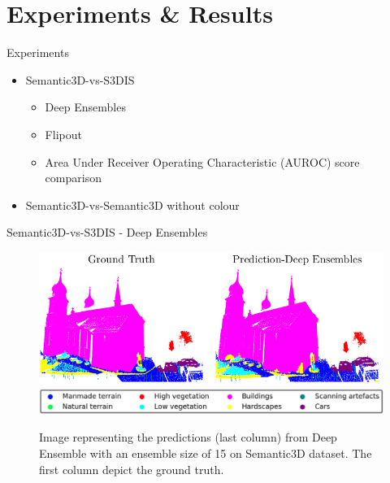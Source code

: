 \documentclass[aspectratio=169]{beamer}
\begin{document}
\section{Experiments \& Results}
\begin{frame}[noframenumbering]{Experiments}
    \begin{itemize}
        \item Semantic3D-vs-S3DIS
        \begin{itemize}
            \item Deep Ensembles
            \item Flipout
            \item Area Under Receiver Operating Characteristic (AUROC) score comparison
        \end{itemize}
        \item Semantic3D-vs-Semantic3D without colour
    \end{itemize}
\end{frame}
\begin{frame}{Semantic3D-vs-S3DIS - Deep Ensembles}
    \begin{figure}
        \centering
        \includegraphics[scale=0.5]{images/sem3d/Sem3d_DE_output.jpg}
        \includegraphics[scale=0.25]{images/legend.jpg}
        \caption{Image representing the predictions (last column) from Deep Ensemble with an ensemble size
        of 15 on Semantic3D dataset. The first column depict the ground truth.}
        \label{fig:sem3d_de_op}
    \end{figure}
\end{frame}
\end{document}

